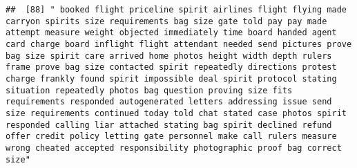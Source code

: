 \documentclass[
]{article}
\begin{document}
\begin{verbatim}
##  [88] " booked flight priceline spirit airlines flight flying made carryon spirits size requirements bag size gate told pay pay made attempt measure weight objected immediately time board handed agent card charge board inflight flight attendant needed send pictures prove bag size spirit care arrived home photos height width depth rulers frame prove bag size contacted spirit repeatedly directions protest charge frankly found spirit impossible deal spirit protocol stating situation repeatedly photos bag question proving size fits requirements responded autogenerated letters addressing issue send size requirements continued today told chat stated case photos spirit responded calling liar attached stating bag spirit declined refund offer credit policy letting gate personnel make call rulers measure wrong cheated accepted responsibility photographic proof bag correct size"                                                                                                                                                                                                                                                                                                                                                                                                                                                                                                                                                                                                                                                                                                                                                                                                                                                                                      

\end{verbatim}
\end{document}
